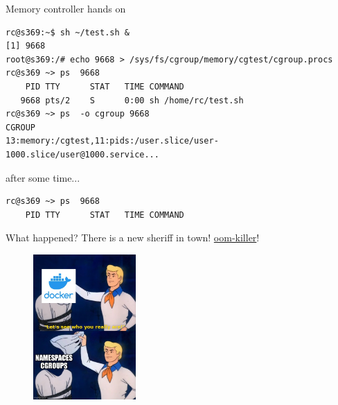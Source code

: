 \documentclass[
  english,          
  aspectratio=169,    %
]{tumbeamer}
\begin{document}
\begin{frame}[fragile]{Memory controller hands on}
\begin{verbatim}
rc@s369:~$ sh ~/test.sh &
[1] 9668
root@s369:/# echo 9668 > /sys/fs/cgroup/memory/cgtest/cgroup.procs
rc@s369 ~> ps  9668
    PID TTY      STAT   TIME COMMAND
   9668 pts/2    S      0:00 sh /home/rc/test.sh
rc@s369 ~> ps  -o cgroup 9668
CGROUP
13:memory:/cgtest,11:pids:/user.slice/user-1000.slice/user@1000.service...
\end{verbatim}
\vspace{3mm}
after some time... 
\vspace{3mm}

\begin{verbatim}
rc@s369 ~> ps  9668
    PID TTY      STAT   TIME COMMAND
\end{verbatim}

What happened? There is a new sheriff in town! \href{https://docs.kernel.org/admin-guide/cgroup-v1/memory.html}{oom-killer}!
\end{frame}
\begin{frame}[fragile]{}
\begin{figure}
    \centering
    \includegraphics[width=0.35\textwidth]{lets-see-meme.png}
\end{figure}
\end{frame}
\end{document}
